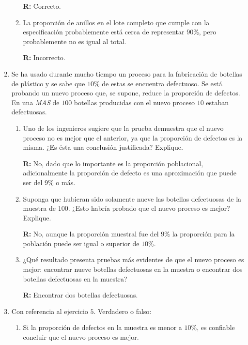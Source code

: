 \documentclass[10pt,a4paper]{book}
\begin{document}
\begin{enumerate}
\begin{enumerate}
		\textbf{R:} Correcto.
		
		\item La proporción de anillos en el lote completo que cumple con la especificación probablemente está cerca de representar $ 90\% $, pero probablemente no es igual al total.
		
		\textbf{R:} Incorrecto.
	\end{enumerate}
	
	\item Se ha usado durante mucho tiempo un proceso para la fabricación de botellas de plástico y se sabe que $ 10\% $ de estas se encuentra defectuoso. Se está probando un nuevo proceso que, se supone, reduce la proporción de defectos. En una \textit{MAS} de $ 100 $ botellas producidas con el nuevo proceso $ 10 $ estaban defectuosas.
	
	\begin{enumerate}
		\item Uno de los ingenieros sugiere que la prueba demuestra que el nuevo proceso no es mejor que el anterior, ya que la proporción de defectos es la misma. ¿Es ésta una conclusión justificada? Explique.
		
		\textbf{R:} No, dado que lo importante es la proporción poblacional, adicionalmente la proporción de defecto es una aproximación que puede ser del $ 9\% $ o más.
		
		\item Suponga que hubieran sido solamente nueve las botellas defectuosas de la muestra de $ 100 $. ¿Esto habría probado que el nuevo proceso es mejor? Explique. 
		
		\textbf{R:} No, aunque la proporción muestral fue del $ 9\% $ la proporción para la población puede ser igual o superior de $ 10\% $.
		
		\item  ¿Qué resultado presenta pruebas más evidentes de que el nuevo proceso es mejor: encontrar nueve botellas defectuosas en la muestra o encontrar dos botellas defectuosas en la muestra?
		
		\textbf{R:} Encontrar dos botellas defectuosas.
	\end{enumerate}
	
	\item  Con referencia al ejercicio $ 5 $. Verdadero o falso:
	
	\begin{enumerate}
		\item Si la proporción de defectos en la muestra es menor a $ 10\% $, es confiable concluir que el nuevo proceso es mejor.
		

\end{enumerate}
\end{enumerate}
\end{document}
